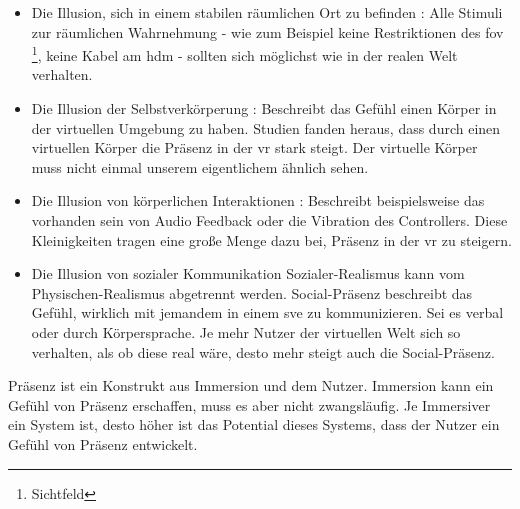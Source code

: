 \documentclass[a4paper,11pt]{article}%
\renewcommand{\\}{\vspace*{0.5\baselineskip} \newline}
\begin{document}
{\begin{itemize}
	\item{Die Illusion, sich in einem stabilen räumlichen Ort zu befinden} : Alle Stimuli zur räumlichen Wahrnehmung - wie zum Beispiel keine Restriktionen des \ac{fov} \footnote{Sichtfeld}, keine Kabel am \ac{hdm} - sollten sich möglichst wie in der realen Welt verhalten. \citep[p.47]{jerald2015vr}
	\item{Die Illusion der Selbstverkörperung} : Beschreibt das Gefühl einen Körper in der virtuellen Umgebung zu haben. Studien fanden heraus, dass durch einen virtuellen Körper die Präsenz in der \ac{vr} stark steigt. \citep[p.756]{botvinick1998rubber} Der virtuelle Körper muss nicht einmal unserem eigentlichem ähnlich sehen. \citep[p.7]{maxwell1960psycho}
	\item{Die Illusion von körperlichen Interaktionen} : Beschreibt beispielsweise das vorhanden sein von Audio Feedback oder die Vibration des Controllers. Diese Kleinigkeiten tragen eine große Menge dazu bei, Präsenz in der \ac{vr} zu steigern. \citep[p.48]{jerald2015vr}
	\item{Die Illusion von sozialer Kommunikation} Sozialer-Realismus kann vom Physischen-Realismus abgetrennt werden. Social-Präsenz beschreibt das Gefühl, wirklich mit jemandem in einem \ac{sve} zu kommunizieren. Sei es verbal oder durch Körpersprache. Je mehr Nutzer der virtuellen Welt sich so verhalten, als ob diese real wäre, desto mehr steigt auch die Social-Präsenz. \citep[p.49]{jerald2015vr} \citep[p.12]{guadagno2007virtual}
\end{itemize}

			Präsenz ist ein Konstrukt aus Immersion und dem Nutzer. Immersion kann ein Gefühl von Präsenz erschaffen, muss es aber nicht zwangsläufig. Je Immersiver ein System ist, desto höher ist das Potential dieses Systems, dass der Nutzer ein Gefühl von Präsenz entwickelt.
			
}
\end{document}
